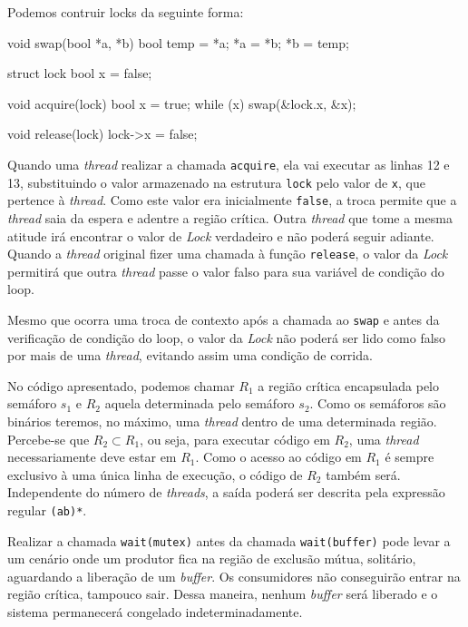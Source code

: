 \quest*{}%

\begin{answer}
Podemos contruir locks da seguinte forma:
\begin{clang}
void swap(bool *a, *b) {
    bool temp = *a;
    *a = *b;
    *b = temp;
}

struct lock {
    bool x = false;
}

void acquire(lock) {
    bool x = true;
    while (x) swap(&lock.x, &x);
}

void release(lock) {
    lock->x = false;
}
\end{clang}
Quando uma \textit{thread} realizar a chamada \texttt{acquire}, ela vai executar as linhas 12 e 13, substituindo o valor armazenado na estrutura \texttt{lock} pelo valor de \texttt{x}, que pertence à \textit{thread}. Como este valor era inicialmente \texttt{false}, a troca permite que a \textit{thread} saia da espera e adentre a região crítica. Outra \textit{thread} que tome a mesma atitude irá encontrar o valor de \textit{Lock} verdadeiro e não poderá seguir adiante. Quando a \textit{thread} original fizer uma chamada à função \texttt{release}, o valor da \textit{Lock} permitirá que outra \textit{thread} passe o valor falso para sua variável de condição do loop.

Mesmo que ocorra uma troca de contexto após a chamada ao \texttt{swap} e antes da verificação de condição do loop, o valor da \textit{Lock} não poderá ser lido como falso por mais de uma \textit{thread}, evitando assim uma condição de corrida.
\end{answer}

\quest*{}%

\begin{answer}
    No código apresentado, podemos chamar $R_1$ a região crítica encapsulada pelo semáforo $s_1$ e $R_2$ aquela determinada pelo semáforo $s_2$. Como os semáforos são binários teremos, no máximo, uma \textit{thread} dentro de uma determinada região. Percebe-se que $R_2 \subset R_1$, ou seja, para executar código em $R_2$, uma \textit{thread} necessariamente deve estar em $R_1$. Como o acesso ao código em $R_1$ é sempre exclusivo à uma única linha de execução, o código de $R_2$ também será. Independente do número de \textit{threads}, a saída poderá ser descrita pela expressão regular \texttt{(ab)*}.
\end{answer}

\quest*{}%

\begin{answer}
    Realizar a chamada \texttt{wait(mutex)} antes da chamada \texttt{wait(buffer)} pode levar a um cenário onde um produtor fica na região de exclusão mútua, solitário, aguardando a liberação de um \textit{buffer}. Os consumidores não conseguirão entrar na região crítica, tampouco sair. Dessa maneira, nenhum \textit{buffer} será liberado e o sistema permanecerá congelado indeterminadamente.
\end{answer}

